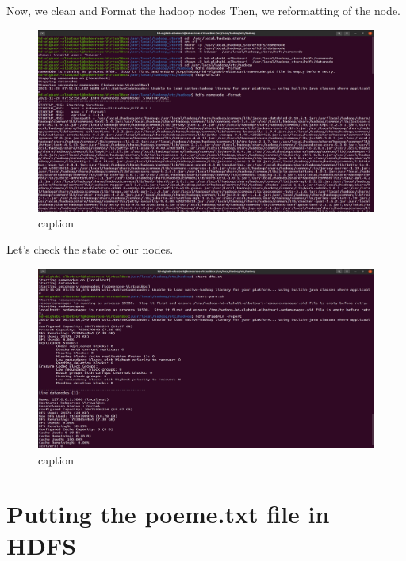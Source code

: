\begin{spacing}{1.2}
\par Now, we clean and Format the hadoop nodes Then, we reformatting of the node.
\\
\begin{figure}[!htb] 
\begin{center} 
\includegraphics[width=1\linewidth]{Big_Data/Spark/Running a Spark Batch app in Java/Clearning and formatting hadoop nodes.jpg} 
\end{center} 
\caption{caption} 
\end{figure} 
\FloatBarrier



\par Let's check the state of our nodes.
\\
\begin{figure}[!htb] 
\begin{center} 
\includegraphics[width=1\linewidth]{Big_Data/Spark/Running a Spark Batch app in Java/Checking live node.jpg} 
\end{center} 
\caption{caption} 
\end{figure} 
\FloatBarrier

\section{Putting the poeme.txt file in HDFS}


\end{spacing}
